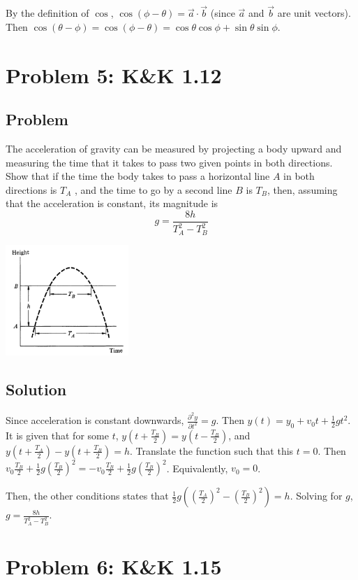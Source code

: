 \documentclass[solutions]{esg8012pset}
\begin{document}
  By the definition of $\cos$, $\cos(\phi - \theta) = \vec a \cdot \vec b$ (since $\vec a$ and $\vec b$ are unit vectors).  Then $\cos(\theta - \phi) = \cos(\phi - \theta) = \cos\theta\cos\phi + \sin\theta\sin\phi$.
\section*{Problem 5: K\&K 1.12}
\subsection*{Problem}
  The acceleration of gravity can be measured by projecting a body upward and measuring the
  time that it takes to pass two given points in both directions. Show that if the time the body takes
  to pass a horizontal line $A$ in both directions is $T_A$ , and the time to go by a second line $B$ is $T_B$,
  then, assuming that the acceleration is constant, its magnitude is
  $$g = \frac{8h}{T_A^2 - T_B^2}$$
  \begin{center}\includegraphics[width=0.35\textwidth]{ps01_1}\end{center}
\subsection*{Solution}
  Since acceleration is constant downwards, $\frac{\partial^2 y}{\partial t^2} = g$.  Then $y(t) = y_0 + v_0 t + \frac{1}{2} g t^2$.  It is given that for some $t$, $y\left(t + \frac{T_B}{2}\right) = y\left(t - \frac{T_B}{2}\right)$, and $y\left(t + \frac{T_A}{2}\right) - y\left(t + \frac{T_B}{2}\right) = h$.  Translate the function such that this $t = 0$.  Then $v_0 \frac{T_B}{2} + \frac{1}{2} g \left(\frac{T_B}{2}\right)^2 = -v_0 \frac{T_B}{2} + \frac{1}{2} g \left(\frac{T_B}{2}\right)^2$.  Equivalently, $v_0 = 0$.

  Then, the other conditions states that $\frac{1}{2} g\left(\left(\frac{T_A}{2}\right)^2 - \left(\frac{T_B}{2}\right)^2\right) = h$.  Solving for $g$, $g = \frac{8h}{T_A^2 - T_B^2}$.
\section*{Problem 6: K\&K 1.15}
\end{document}
